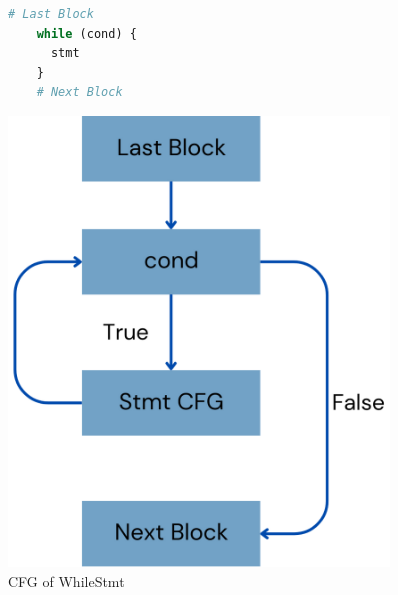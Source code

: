 \begin{figure}
  \centering
  \begin{minipage}{0.45\textwidth}
    \begin{lstlisting}[language=python]
    # Last Block
    while (cond) {
      stmt
    }
    # Next Block
    \end{lstlisting}
  \end{minipage}%
  \hfill
  \begin{minipage}{0.225\textwidth}
    \centering
    \includegraphics[width=0.9\textwidth]{img/whilestmt-cfg.png}
  \end{minipage}
  \caption{CFG of WhileStmt}
\end{figure}

